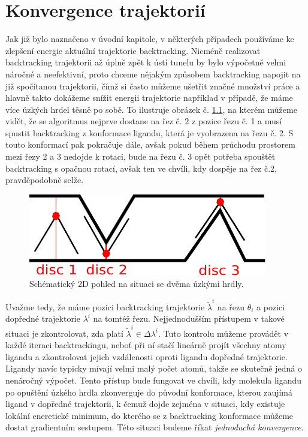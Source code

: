 \chapter{Konvergence trajektorií}
Jak již bylo naznačeno v úvodní kapitole, v některých případech používáme ke
zlepšení energie aktuální trajektorie backtracking. Nicméně realizovat
backtracking trajektorii až úplně zpět k ústí tunelu by bylo výpočetně velmi náročné
a neefektivní, proto chceme nějakým způsobem backtracking napojit na již
spočítanou trajektorii, čímž si často můžeme ušetřit značné množství práce a hlavně
takto dokážeme snížit energii trajektorie například v případě, že máme více úzkých
hrdel těsně po sobě. To ilustruje obrázek č. \ref{fig:two_bottlenecks}, na kterém
můžeme vidět, že se algoritmus nejprve dostane na řez č. 2 z pozice řezu č. 1
a musí spustit backtracking z konformace ligandu, která je vyobrazena na řezu č. 2.
S touto konformací pak pokračuje dále, avšak pokud během průchodu prostorem
mezi řezy 2 a 3 nedojde k rotaci, bude na řezu č. 3 opět potřeba spouštět
backtracking s opačnou rotací, avšak ten ve chvíli, kdy dospěje na řez č.2,
pravděpodobně selže.

\begin{figure}[ht]
\centering
\includegraphics[width=.5\hsize]{img/two_bottlenecks.pdf}
\caption{Schématický 2D pohled na situaci se dvěma úzkými hrdly.}
\label{fig:two_bottlenecks}
\end{figure}

Uvažme tedy, že máme pozici backtracking trajektorie $ \tilde{\lambda}^i $
na řezu $ \theta_i $ a pozici dopředné trajektorie $ \lambda^i $ na tomtéž řezu.
Nejjednodušším přístupem v takové situaci je zkontrolovat, zda platí
$ \tilde{\lambda}^i \in \Delta \lambda^i $. Tuto kontrolu můžeme provádět v každé
iteraci backtrackingu, neboť při ní stačí lineárně projít všechny atomy ligandu
a zkontrolovat jejich vzdálenosti oproti ligandu dopředné trajektorie. Ligandy
navíc typicky mívají velmi malý počet atomů, takže se skutečně jedná o nenáročný
výpočet. Tento přístup bude fungovat ve chvíli, kdy molekula ligandu po opuštění
úzkého hrdla zkonverguje do původní konformace, kterou zaujímá ligand v dopředné
trajektorii, k čemuž dojde zejména v situaci, kdy existuje lokální eneretické
minimum, do kterého se z backtracking konformace můžeme dostat gradientním sestupem.
Této situaci budeme říkat \textit{jednoduchá konvergence}.

